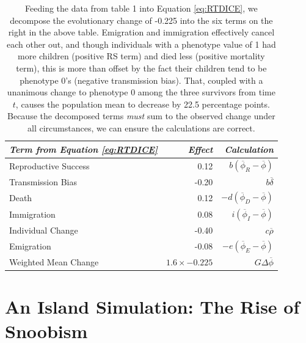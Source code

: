 	\begin{table}[htbp]
  \begin{footnotesize}
  \begin{center}
  \begin{tabular}{lrr}
    
  \textit{Term from Equation \ref{eq:RTDICE}} & \textit{Effect} & \textit{Calculation}\\
  \hline
	Reproductive Success & 0.12	&	$b(\overline{\phi}_{R} - \overline{\phi})$ \\
	Transmission Bias & -0.20	&	$b\overline{\delta}$ \\
	Death & 0.12	&	$-d(\overline{\phi}_D - \overline{\phi})$ \\
	Immigration & 0.08	&	$i(\overline{\phi}_I - \overline{\phi})$\\
	Individual Change &	-0.40	&	$c\overline{\rho}$ \\
	Emigration & -0.08	&	$-e(\overline{\phi}_E - \overline{\phi})$\\
	\hline
	Weighted Mean Change & $1.6 \times -0.225$ &	$G \Delta \overline{\phi}$\\
  
  \end{tabular}%
  \caption{Feeding the data from table 1 into Equation \ref{eq:RTDICE}, we decompose the evolutionary change of -0.225 into the six terms on the right in the above table.  Emigration and immigration effectively cancel each other out, and though individuals with a phenotype value of 1 had more children (positive RS term) and died less (positive mortality term), this is more than offset by the fact their children tend to be phenotype 0's (negative transmission bias).  That, coupled with a unanimous change to phenotype 0 among the three survivors from time $t$, causes the population mean to decrease by 22.5 percentage points.  Because the decomposed terms \textit{must} sum to the observed change under all circumstances, we can ensure the calculations are correct.}
  \label{tab:DemoDecomp}
  \end{center}
  \end{footnotesize}
	\end{table}%
	
	
\section{An Island Simulation: The Rise of Snoobism}

